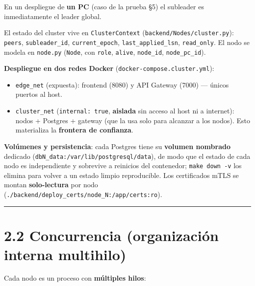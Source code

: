 \documentclass[11pt]{article}
\begin{document}
En un despliegue de \textbf{un PC} (caso de la prueba §5) el subleader es inmediatamente el leader global.

El estado del cluster vive en \texttt{ClusterContext} (\texttt{backend/\allowbreak{}Nodes/\allowbreak{}cluster.\allowbreak{}py}): \texttt{peers}, \texttt{subleader\_\allowbreak{}id}, \texttt{current\_\allowbreak{}epoch}, \texttt{last\_\allowbreak{}applied\_\allowbreak{}lsn}, \texttt{read\_\allowbreak{}only}. El nodo se modela en \texttt{node.\allowbreak{}py} (\texttt{Node}, con \texttt{role}, \texttt{alive}, \texttt{node\_\allowbreak{}id}, \texttt{node\_\allowbreak{}pc\_\allowbreak{}id}).

\textbf{Despliegue en dos redes Docker} (\texttt{docker-compose.\allowbreak{}cluster.\allowbreak{}yml}):

\begin{itemize}
\item \texttt{edge\_\allowbreak{}net} (expuesta): frontend (8080) y API Gateway (7000) — únicos puertos al host.
\item \texttt{cluster\_\allowbreak{}net} (\texttt{internal:\allowbreak{} true}, \textbf{aislada} sin acceso al host ni a internet): nodos + Postgres + gateway (que la usa solo para alcanzar a los nodos). Esto materializa la \textbf{frontera de confianza}.
\end{itemize}

\textbf{Volúmenes y persistencia}: cada Postgres tiene su \textbf{volumen nombrado} dedicado (\texttt{dbN\_\allowbreak{}data:\allowbreak{}/\allowbreak{}var/\allowbreak{}lib/\allowbreak{}postgresql/\allowbreak{}data}), de modo que el estado de cada nodo es independiente y sobrevive a reinicios del contenedor; \texttt{make down -v} los elimina para volver a un estado limpio reproducible. Los certificados mTLS se montan \textbf{solo-lectura} por nodo (\texttt{.\allowbreak{}/\allowbreak{}backend/\allowbreak{}deploy\_\allowbreak{}certs/\allowbreak{}node\_\allowbreak{}N:\allowbreak{}/\allowbreak{}app/\allowbreak{}certs:\allowbreak{}ro}).

\vspace{2pt}\noindent\rule{\textwidth}{0.4pt}\vspace{2pt}

\section{2.2 Concurrencia (organización interna multihilo)}

Cada nodo es un proceso con \textbf{múltiples hilos}:
\end{document}

